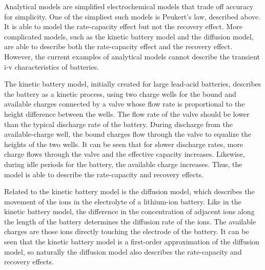 Analytical models are simplified electrochemical models that trade off accuracy for simplicity. One of the simpliest such models is Peukert's law, described above. It is able to model the rate-capacity effect but not the recovery effect. More complicated models, such as the kinetic battery model and the diffusion model, are able to describe both the rate-capacity effect and the recovery effect. However, the current examples of analytical models cannot describe the transient i-v characteristics of batteries.

The kinetic battery model, initially created for large lead-acid batteries, describes the battery as a kinetic process, using two charge wells for the bound and available charges connected by a valve whose flow rate is proportional to the height difference between the wells\cite{manwell93}. The flow rate of the valve should be lower than the typical discharge rate of the battery. During discharge from the available-charge well, the bound charges flow through the valve to equalize the heights of the two wells. It can be seen that for slower discharge
rates, more charge flows through the valve and the effective capacity increases. Likewise, during idle periods for the battery, the available charge increases. Thus, the model is able to describe the rate-capacity and recovery effects.

Related to the kinetic battery model is the diffusion model, which describes the movement of the ions in the electrolyte of a lithium-ion battery\cite{rakhmatov01}. Like in the kinetic battery model, the difference in the concentration of adjacent ions along the length of the battery determines the diffusion rate of the ions. The available charges are those ions directly touching the electrode of the battery. It can be seen that the kinetic battery model is a first-order approximation of the diffusion
model\cite{jongerden09}, so naturally the diffusion model also describes the rate-capacity and recovery effects.




